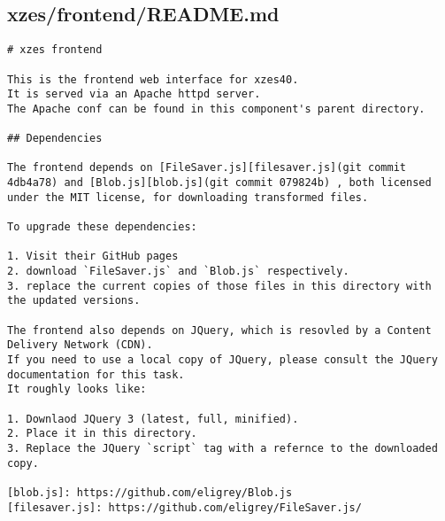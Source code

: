 \subsection{xzes/frontend/README.md}
\begin{lstlisting}
# xzes frontend

This is the frontend web interface for xzes40.
It is served via an Apache httpd server.
The Apache conf can be found in this component's parent directory.

## Dependencies

The frontend depends on [FileSaver.js][filesaver.js](git commit 4db4a78) and [Blob.js][blob.js](git commit 079824b) , both licensed under the MIT license, for downloading transformed files.

To upgrade these dependencies:

1. Visit their GitHub pages
2. download `FileSaver.js` and `Blob.js` respectively.
3. replace the current copies of those files in this directory with the updated versions.

The frontend also depends on JQuery, which is resovled by a Content Delivery Network (CDN).
If you need to use a local copy of JQuery, please consult the JQuery documentation for this task.
It roughly looks like:

1. Downlaod JQuery 3 (latest, full, minified).
2. Place it in this directory.
3. Replace the JQuery `script` tag with a refernce to the downloaded copy.

[blob.js]: https://github.com/eligrey/Blob.js
[filesaver.js]: https://github.com/eligrey/FileSaver.js/
\end{lstlisting}
